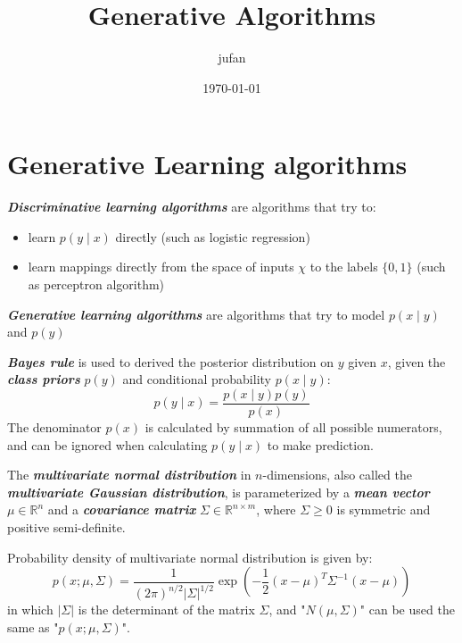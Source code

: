 \documentclass{article}
\begin{document}
\title{Generative Algorithms}\author{jufan}\date{\today}
\maketitle
\tableofcontents

\section{Generative Learning algorithms}
\emph{\textbf{Discriminative learning algorithms}} are algorithms that try to:
\begin{itemize}
  \item learn $p(y\mid x)$ directly (such as logistic regression)
  \item learn mappings directly from the space of inputs $\chi$ to the labels $\{0,1\}$ (such as perceptron algorithm)
\end{itemize}

\emph{\textbf{Generative learning algorithms}} are algorithms that try to model $p(x\mid y)$ and $p(y)$

\begin{spacing}{2}
\end{spacing}

\emph{\textbf{Bayes rule}} is used to derived the posterior distribution on $y$ given $x$, given the \emph{\textbf{class priors}} $p(y)$ and conditional probability $p(x\mid y)$:
\begin{equation*}
p(y\mid x) = \frac{p(x\mid y)p(y)}{p(x)}
\end{equation*}
The denominator $p(x)$ is calculated by summation of all possible numerators, and can be ignored when calculating $p(y\mid x)$ to make prediction.

The \emph{\textbf{multivariate normal distribution}} in $n$-dimensions, also called the \emph{\textbf{multivariate Gaussian distribution}}, is parameterized by a \emph{\textbf{mean vector}} $\mu\in\mathbb{R}^n$ and a \emph{\textbf{covariance matrix}} $\Sigma\in\mathbb{R}^{n\times m}$, where $\Sigma \geq 0$ is symmetric and positive semi-definite.

Probability density of multivariate normal distribution is given by:
\begin{equation*}
p(x;\mu,\Sigma)=\frac{1}{(2\pi)^{n/2}\lvert\Sigma\rvert^{1/2}}\exp\left(-\frac{1}{2}(x-\mu)^T\Sigma^{-1}(x-\mu)\right)
\end{equation*}
in which $\lvert\Sigma\rvert$ is the determinant of the matrix $\Sigma$, and "$N(\mu,\Sigma)$" can be used the same as "$p(x;\mu,\Sigma)$".
\end{document}
